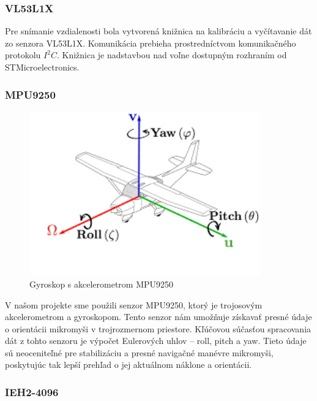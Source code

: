 \subsubsection{VL53L1X}
Pre snímanie vzdialenosti bola vytvorená knižnica na kalibráciu a vyčítavanie dát zo senzora VL53L1X. Komunikácia prebieha prostredníctvom komunikačného protokolu $I^2 C$. Knižnica je nadstavbou nad voľne dostupným rozhraním od STMicroelectronics.

\subsubsection{MPU9250}

\begin{figure}[!htpb]
    \centering
    \includegraphics[width=10cm]{includes//images/rpy.png}
    \caption{Gyroskop s akcelerometrom MPU9250 }
    \label{fig:UDP}
\end{figure}
V našom projekte sme použili senzor MPU9250, ktorý je trojosovým akcelerometrom a gyroskopom. Tento senzor nám umožňuje získavať presné údaje o orientácii mikromyši v trojrozmernom priestore. Kľúčovou súčasťou spracovania dát z tohto senzoru je výpočet Eulerových uhlov -- roll, pitch a yaw. Tieto údaje sú neoceniteľné pre stabilizáciu a presné navigačné manévre mikromyši, poskytujúc tak lepší prehľad o jej aktuálnom náklone a orientácii.

\subsubsection{IEH2-4096}



